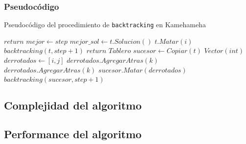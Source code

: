 \subsubsection{Pseudocódigo}
  \begin{algorithm}[H]
  \begin{algorithmic}
  \caption{Pseudocódigo del procedimiento de \texttt{backtracking} en Kamehameha}
      \State $return$
    \EndIf
      \State $mejor \gets step$
      \State $mejor\_sol \gets t.Solucion()$
    \Else
      \For {$i \in [0,..., n),$ $t.EstaVivo?(i)$}
          \State $t.Matar(i)$
          \State $backtracking(t, step+1)$
          \State $return$
        \EndIf
        \For {$j \in [0,..., n),$ $j \neq i \land t.EstaVivo?(j)$}
          \State $Tablero$ $sucesor \gets Copiar(t)$
          \State $Vector(int)$ $derrotados \gets [i, j]$ 
          \For {$k \in [0,..., n),$ $k \neq i \land k \neq j \land t.EstaVivo?(k)$}
                \State $derrotados.AgregarAtras(k)$
              \EndIf
            \Else 
                \State $derrotados.AgregarAtras(k)$
              \EndIf
            \EndIf
          \EndFor
          \State $sucesor.Matar(derrotados)$
          \State $backtracking(sucesor, step+1)$
        \EndFor
      \EndFor
    \EndIf
    \EndProcedure
  \end{algorithmic}
  \end{algorithm}

\subsection{Complejidad del algoritmo}

\subsection{Performance del algoritmo}
